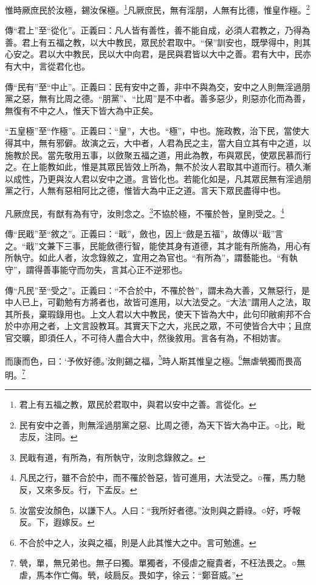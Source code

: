 惟時厥庶民於汝極，錫汝保極。\footnote{君上有五福之教，眾民於君取中，與君以安中之善。言從化。}凡厥庶民，無有淫朋，人無有比德，惟皇作極。\footnote{民有安中之善，則無淫過朋黨之惡、比周之德，為天下皆大為中正。○比，毗志反，注同。}

{\noindent\zhuan{}\fzbyks 傳“君上”至“從化”。正義曰：凡人皆有善性，善不能自成，必須人君教之，乃得為善。君上有五福之教，以大中教民，眾民於君取中。“保”訓安也，既學得中，則其心安之。君以大中教民，民以大中向君，是民與君皆以大中之善。君有大中，民亦有大中，言從君化也。 \par}

{\noindent\zhuan{}\fzbyks 傳“民有”至“中止”。正義曰：民有安中之善，非中不與為交，安中之人則無淫過朋黨之惡，無有比周之德。“朋黨”、“比周”是不中者。善多惡少，則惡亦化而為善，無復有不中之人，惟天下皆大為中正矣。 \par}

{\noindent\shu{}\fzkt “五皇極”至“作極”。正義曰：“皇”，大也。“極”，中也。施政教，治下民，當使大得其中，無有邪僻。故演之云，大中者，人君為民之主，當大自立其有中之道，以施教於民。當先敬用五事，以斂聚五福之道，用此為教，布與眾民，使眾民慕而行之。在上能教如此，惟是其眾民皆效上所為，無不於汝人君取其中道而行。積久漸以成性，乃更與汝人君以安中之道。言皆化也。若能化如是，凡其眾民無有淫過朋黨之行，人無有惡相阿比之德，惟皆大為中正之道。言天下眾民盡得中也。 \par}

凡厥庶民，有猷有為有守，汝則念之。\footnote{民戢有道，有所為，有所執守，汝則念錄敘之。}不協於極，不罹於咎，皇則受之。\footnote{凡民之行，雖不合於中，而不罹於咎惡，皆可進用，大法受之。○罹，馬力馳反，又來多反。行，下孟反。}


{\noindent\zhuan{}\fzbyks 傳“民戢”至“敘之”。正義曰：“戢”，斂也，因上“斂是五福”，故傳以“戢”言之。“戢”文兼下三事，民能斂德行智，能使其身有道德，其才能有所施為，用心有所執守。如此人者，汝念錄敘之，宜用之為官也。“有所為”，謂藝能也。“有執守”，謂得善事能守而勿失，言其心正不逆邪也。 \par}

{\noindent\zhuan{}\fzbyks 傳“凡民”至“受之”。正義曰：“不合於中，不罹於咎”，謂未為大善，又無惡行，是中人已上，可勸勉有方將者也，故皆可進用，以大法受之。“大法”謂用人之法，取其所長，棄瑕錄用也。上文人君以大中教民，使天下皆為大中，此句印敝痢邦不合於中亦用之者，上文言設教耳。其實天下之大，兆民之眾，不可使皆合大中；且庶官交曠，即須任人，不可待人盡合大中，然後敘用。言各有為，不相妨害。 \par}

而康而色，曰：‘予攸好德。’汝則錫之福，\footnote{汝當安汝顏色，以謙下人。人曰：“我所好者德。”汝則與之爵祿。○好，呼報反。下，遐嫁反。}時人斯其惟皇之極。\footnote{不合於中之人，汝與之福，則是人此其惟大之中。言可勉進。}無虐煢獨而畏高明。\footnote{煢，單，無兄弟也。無子曰獨。單獨者，不侵虐之寵貴者，不枉法畏之。○無虐，馬本作亡侮。煢，岐扃反。畏如字，徐云：“鄭音威。”}

